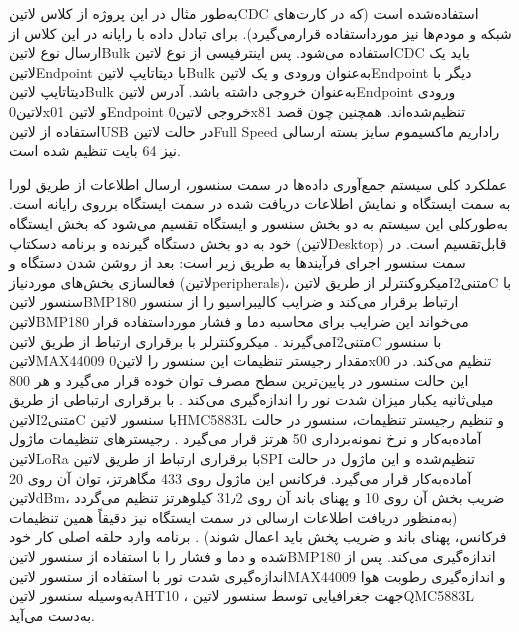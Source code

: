 به‌طور مثال در این پروژه از کلاس ‌لاتین{CDC} استفاده‌شده است (که در کارت‌های شبکه و مودم‌ها نیز مورداستفاده قرارمی‌گیرد). برای تبادل داده با رایانه در این کلاس از ارسال نوع ‌لاتین{Bulk} استفاده می‌شود. پس اینترفیسی از نوع ‌لاتین{CDC} باید یک ‌لاتین{Endpoint} با دیتاتایپ ‌لاتین{Bulk} به‌عنوان ورودی و یک ‌لاتین{Endpoint} دیگر با دیتاتایپ ‌لاتین{Bulk} به‌عنوان خروجی داشته باشد. آدرس ‌لاتین{Endpoint} ورودی ‌لاتین{0x01} و ‌لاتین{Endpoint} خروجی ‌لاتین{0x81} تنظیم‌شده‌اند. همچنین چون قصد استفاده از ‌لاتین{USB} در حالت ‌لاتین{Full Speed} راداریم ماکسیموم سایز بسته ارسالی نیز 64 بایت تنظیم شده است. 


عملکرد کلی سیستم جمع‌آوری داده‌ها در سمت سنسور، ارسال اطلاعات از طریق لورا به سمت ایستگاه و نمایش اطلاعات دریافت شده در سمت ایستگاه برروی رایانه است. به‌طورکلی این سیستم به دو بخش سنسور و ایستگاه تقسیم می‌شود که بخش ایستگاه خود به دو بخش دستگاه گیرنده و برنامه دسکتاپ (‌لاتین{Desktop}) قابل‌تقسیم است. در سمت سنسور اجرای فرآیندها به طریق زیر است:
بعد از روشن شدن دستگاه و فعالسازی بخش‌های موردنیاز (‌لاتین{peripherals})، میکروکنترلر از طریق ‌لاتین{I‌متنی{2}C} با سنسور ‌لاتین{BMP180} ارتباط برقرار می‌کند و ضرایب کالیبراسیو را از سنسور ‌لاتین{BMP180} می‌خواند این ضرایب برای محاسبه دما و فشار مورداستفاده قرار می‌گیرند .
میکروکنترلر با برقراری ارتباط از طریق ‌لاتین{I‌متنی{2}C} با سنسور ‌لاتین{MAX44009} مقدار رجیستر تنظیمات این سنسور را ‌لاتین{0x00} تنظیم می‌کند. در این حالت سنسور در پایین‌ترین سطح مصرف توان خوده قرار می‌گیرد و هر 800 میلی‌ثانیه یکبار میزان شدت نور را اندازه‌گیری می‌کند .
با برقراری ارتباطی از طریق ‌لاتین{I‌متنی{2}C} با سنسور ‌لاتین{HMC5883L} و تنظیم رجیستر تنظیمات، سنسور در حالت آماده‌به‌کار و نرخ نمونه‌برداری 50 هرتز قرار می‌گیرد .
رجیسترهای تنظیمات ماژول ‌لاتین{LoRa} با برقراری ارتباط از طریق ‌لاتین{SPI} تنظیم‌شده و این ماژول در حالت آماده‌به‌کار قرار می‌گیرد. فرکانس این ماژول روی 433 مگاهرتز، توان آن روی 20 ‌لاتین{dBm}، ضریب بخش آن روی 10 و پهنای باند آن روی 31٫2 کیلوهرتز تنظیم می‌گردد (به‌منظور دریافت اطلاعات ارسالی در سمت ایستگاه نیز دقیقاً همین تنظیمات فرکانس، پهنای باند و ضریب پخش باید اعمال شوند) .
برنامه وارد حلقه اصلی کار خود شده و دما و فشار را با استفاده از سنسور ‌لاتین{BMP180} اندازه‌گیری می‌کند. 
پس از اندازه‌گیری شدت نور با استفاده از سنسور ‌لاتین{MAX44009}  و اندازه‌گیری رطوبت هوا به‌وسیله سنسور ‌لاتین{AHT10} ، جهت جغرافیایی توسط سنسور ‌لاتین{QMC5883L}  به‌دست می‌آید. 
